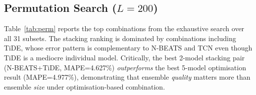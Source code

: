 \documentclass[conference]{IEEEtran}
\begin{document}
\begin{table}[t]
  \caption{Ensemble methods, $L=200$, held-out. All 6 models included.}
  \label{tab:ens200}
  \centering
\end{table}

\subsection{Permutation Search ($L=200$)}

Table~\ref{tab:perm} reports the top combinations from the exhaustive search
over all 31 subsets. The stacking ranking is dominated by combinations
including TiDE, whose error pattern is complementary to N-BEATS and TCN even
though TiDE is a mediocre individual model. Critically, the best 2-model
stacking pair (N-BEATS+TiDE, MAPE=4.627\%) \emph{outperforms} the best
5-model optimisation result (MAPE=4.977\%), demonstrating that ensemble
\emph{quality} matters more than ensemble \emph{size} under optimisation-based
combination.

\begin{table}[t]
  \caption{Top combinations from permutation search ($L=200$, held-out).
           iTransformer excluded. Full-set stacking/opt from Table~\ref{tab:ens200}.}
  \label{tab:perm}
  \centering
\end{table}
\end{document}

